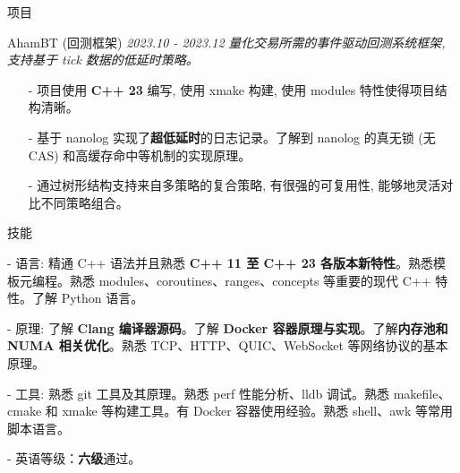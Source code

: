\documentclass{resume} %
\begin{document}
\begin{rSection}{项目}
\begin{rSubsection}
    {AhamBT (回测框架)} {\em 2023.10 - 2023.12}
    {\textit{量化交易所需的事件驱动回测系统框架, 支持基于 tick 数据的低延时策略。}}
    {\textit{}}
    \item[]
    \begin{itemize}
        \setlength\itemsep{-0.5em}
        \item[-] 项目使用 \textbf{C++ 23} 编写, 使用 xmake 构建, 使用 modules 特性使得项目结构清晰。
        \item[-] 基于 nanolog 实现了\textbf{超低延时}的日志记录。了解到 nanolog 的真无锁 (无 CAS) 和高缓存命中等机制的实现原理。
        \item[-] 通过树形结构支持来自多策略的复合策略, 有很强的可复用性, 能够地灵活对比不同策略组合。
    \end{itemize}
\end{rSubsection}
\end{rSection}


\begin{rSection}{技能}
\begin{rSubsection}
{}{}{}{}
\item[-] 语言: 精通 C++ 语法并且熟悉 \textbf{C++ 11 至 C++ 23 各版本新特性}。熟悉模板元编程。熟悉 modules、coroutines、ranges、concepts 等重要的现代 C++ 特性。了解 Python 语言。
\item[-] 原理: 了解 \textbf{Clang 编译器源码}。了解 \textbf{Docker 容器原理与实现}。了解\textbf{内存池和 NUMA 相关优化}。熟悉 TCP、HTTP、QUIC、WebSocket 等网络协议的基本原理。
\item[-] 工具: 熟悉 git 工具及其原理。熟悉 perf 性能分析、lldb 调试。熟悉 makefile、cmake 和 xmake 等构建工具。有 Docker 容器使用经验。熟悉 shell、awk 等常用脚本语言。
\item[-] 英语等级：\textbf{六级}通过。
\end{rSubsection}
\end{rSection}

\end{document}
